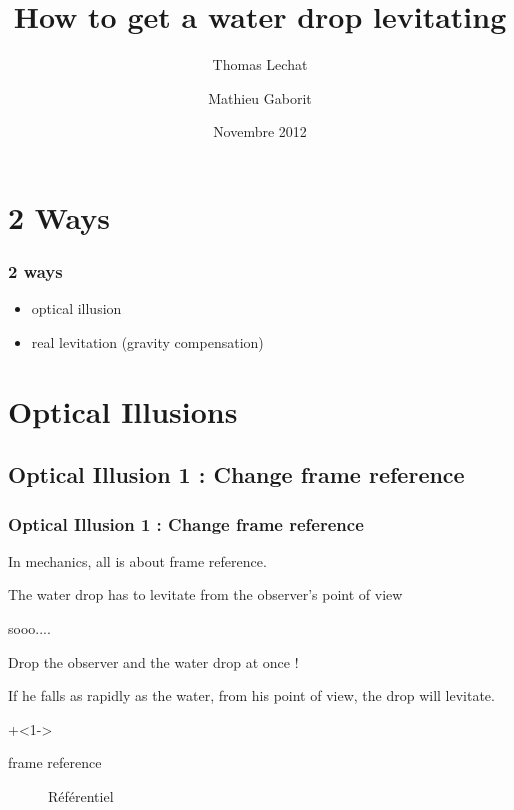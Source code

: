 \documentclass{beamer}
\title[How to get a water drop levitating]{How to get a water drop levitating}
\institute{Université du Maine}
\author{Thomas Lechat \and Mathieu Gaborit}
\date{Novembre 2012}
\begin{document}
\begin{frame}
\titlepage
\end{frame}

\section{2 Ways}
\begin{frame}
\frametitle{2 ways}

\begin{itemize}
    \item optical illusion
    \item real levitation (gravity compensation)
\end{itemize}

\end{frame}

\section{Optical Illusions}
\subsection{Optical Illusion 1 : Change frame reference}
\begin{frame}
\frametitle{Optical Illusion 1 : Change frame reference}

In mechanics, all is about frame reference.

The water drop has to levitate from the observer's point of view

\pause
\begin{center}
sooo....
\end{center}

\pause

\begin{center}
Drop the observer and the water drop at once !
\end{center}

\pause

If he falls as rapidly as the water, from his point of view, the drop will levitate.

\onslide+<1->
\begin{description} 
    \item[frame reference] Référentiel
\end{description}
\end{frame}
\end{document}
